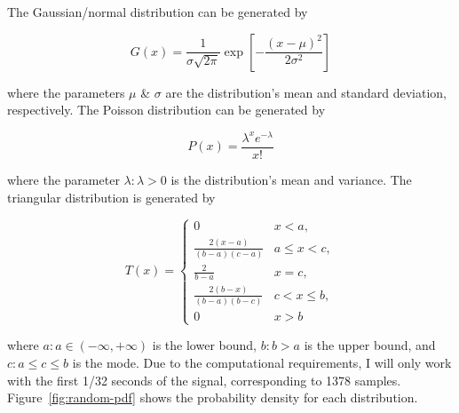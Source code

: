 The Gaussian/normal distribution can be generated by

\begin{equation}
	\label{eq:random-gaussian}
	G(x) = \frac{1}{\sigma\sqrt{2\pi}} \exp[-\frac{(x - \mu)^2}{2\sigma^2}]
\end{equation}

\noindent where the parameters $\mu$ \& $\sigma$ are the distribution's mean and standard deviation, respectively. The Poisson distribution can be generated by

\begin{equation}
	\label{eq:random-poisson}
	P(x) = \frac{\lambda^x e^{-\lambda}}{x!}
\end{equation}

\noindent where the parameter $\lambda: \lambda > 0$ is the distribution's mean and variance. The triangular distribution is generated by

\begin{equation}
	\label{eq:random-triangular}
	T(x) = \begin{cases}
		0 & x < a, \\
		\frac{2(x-a)}{(b - a)(c - a)} & a \leq x < c, \\
		\frac{2}{b - a} & x = c, \\
		\frac{2(b - x)}{(b - a)(b - c)} & c < x \leq b, \\
		0 & x > b
	\end{cases}
\end{equation}

\noindent where $a: a \in (-\infty, +\infty)$ is the lower bound, $b: b > a$ is the upper bound, and $c: a \leq c \leq b$ is the mode. Due to the computational requirements, I will only work with the first 1/32 seconds of the signal, corresponding to 1378 samples. Figure~\ref{fig:random-pdf} shows the probability density for each distribution.

